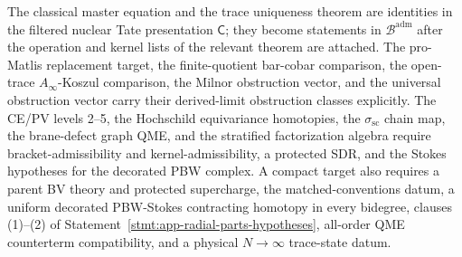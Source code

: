\begin{rmk}
\label{rmk:completion-three-tier}
The classical master equation and the trace uniqueness theorem are
identities in the filtered nuclear Tate presentation \(\mathsf C\); they
become statements in \(\mathcal B^{\mathrm{adm}}\) after the operation
and kernel lists of the relevant theorem are attached.  The pro-Matlis
replacement target, the finite-quotient bar-cobar comparison, the
open-trace \(A_\infty\)-Koszul comparison, the Milnor obstruction
vector, and the universal obstruction vector carry their derived-limit
obstruction classes explicitly.  The CE/PV levels 2--5, the Hochschild
equivariance homotopies, the \(\sigma_{\mathrm{sc}}\) chain map, the
brane-defect graph QME, and the stratified factorization algebra require
bracket-admissibility and kernel-admissibility, a protected SDR, and
the Stokes hypotheses for the decorated PBW complex.  A compact target
also requires a parent BV theory and protected supercharge, the
matched-conventions datum, a uniform decorated PBW-Stokes contracting
homotopy in every bidegree, clauses (1)--(2) of
Statement~\ref{stmt:app-radial-parts-hypotheses}, all-order QME
counterterm compatibility, and a physical \(N\to\infty\) trace-state
datum.
\end{rmk}
